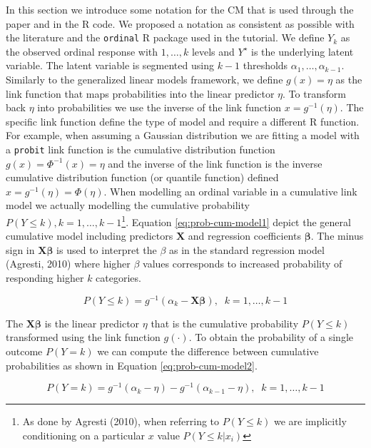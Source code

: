 \documentclass[
  man,floatsintext]{apa6}
\begin{document}
In this section we introduce some notation for the CM that is used through the paper and in the R code. We proposed a notation as consistent as possible with the literature and the \texttt{ordinal} R package used in the tutorial. We define \(Y_k\) as the observed ordinal response with \(1, \dots, k\) levels and \(Y^\star\) is the underlying latent variable. The latent variable is segmented using \(k - 1\) thresholds \(\alpha_1, \dots, \alpha_{k - 1}\). Similarly to the generalized linear models framework, we define \(g(x) = \eta\) as the link function that maps probabilities into the linear predictor \(\eta\). To transform back \(\eta\) into probabilities we use the inverse of the link function \(x = g^{-1}(\eta)\). The specific link function define the type of model and require a different R function. For example, when assuming a Gaussian distribution we are fitting a model with a \texttt{probit} link function is the cumulative distribution function \(g(x) = \Phi^{-1}(x) = \eta\) and the inverse of the link function is the inverse cumulative distribution function (or quantile function) defined \(x = g^{-1}(\eta) = \Phi(\eta)\). When modelling an ordinal variable in a cumulative link model we actually modelling the cumulative probability \(P(Y \leq k), k = 1, \dots, k - 1\)\footnote{As done by Agresti (2010), when referring to \(P(Y \leq k)\) we are implicitly conditioning on a particular \(x\) value \(P(Y \leq k | x_i)\)}. Equation \eqref{eq:prob-cum-model1} depict the general cumulative model including predictors \(\mathbf{X}\) and regression coefficients \(\boldsymbol{\beta}\). The minus sign in \(\mathbf{X} \boldsymbol{\beta}\) is used to interpret the \(\beta\) as in the standard regression model (Agresti, 2010) where higher \(\beta\) values corresponds to increased probability of responding higher \(k\) categories.

\begin{equation} 
P(Y \leq k) = g^{-1}(\alpha_k - \mathbf{X} \boldsymbol{\beta}), \;\;k = 1, \dots, k - 1
\label{eq:prob-cum-model1}
\end{equation}

The \(\mathbf{X} \boldsymbol{\beta}\) is the linear predictor \(\eta\) that is the cumulative probability \(P(Y \leq k)\) transformed using the link function \(g(\cdot)\). To obtain the probability of a single outcome \(P(Y = k)\) we can compute the difference between cumulative probabilities as shown in Equation \eqref{eq:prob-cum-model2}.

\begin{equation} 
P(Y = k) = g^{-1}(\alpha_k - \eta) -  g^{-1}(\alpha_{k - 1} - \eta), \;\;k = 1, \dots, k - 1
\label{eq:prob-cum-model2}
\end{equation}
\end{document}
